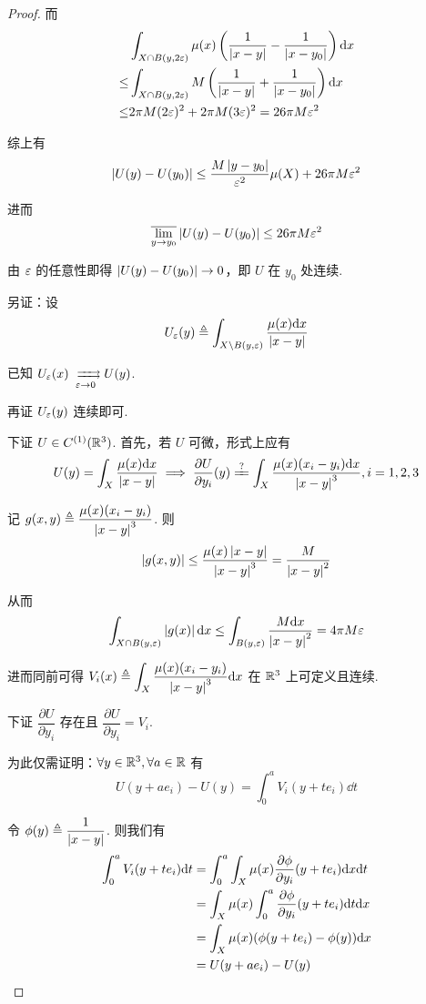 \begin{proof}
    而
$$
\begin{aligned}
    &\int_{X\cap B(y,2\varepsilon)}\mu(x)\left(\frac{1}{\left\lvert{x-y}\right\rvert}-\frac{1}{\left\lvert{x-y_0}\right\rvert}\right)\mathrm{d} x\\
    \le&\int_{X\cap B(y,2\varepsilon)}M\left(\frac{1}{\left\lvert{x-y}\right\rvert}+\frac{1}{\left\lvert{x-y_0}\right\rvert}\right)\mathrm{d} x\\
    \le&2\pi M(2\varepsilon)^2+2\pi M(3\varepsilon)^2=26\pi M\varepsilon^2
\end{aligned}
$$

    综上有
$$
\left\lvert{U(y)-U(y_0)}\right\rvert\le\frac{M\left\lvert{y-y_0}\right\rvert}{\varepsilon^2}\mu(X)+26\pi M\varepsilon^2
$$

    进而
$$
\overline{\lim_{y\to y_0}}\left\lvert{U(y)-U(y_0)}\right\rvert\le 26\pi M\varepsilon^2
$$

    由 $\varepsilon$ 的任意性即得 $\left\lvert{U(y)-U(y_0)}\right\rvert\to 0$，即 $U$ 在 $y_0$ 处连续.

    \begin{hint}
        另证：设
$$
U_\varepsilon(y)\triangleq\int_{X\setminus B(y,\varepsilon)}\frac{\mu(x)\mathrm{d} x}{\left\lvert{x-y}\right\rvert}
$$

        已知 $U_\eps(x)\xrightrightarrows[\eps\to 0]{}U(y)$.

        再证 $U_\varepsilon(y)$ 连续即可.
    \end{hint}

    下证 $U\in C^{(1)}(\mathbb{R}^3)$. 首先，若 $U$ 可微，形式上应有
$$
U(y)=\int_X\frac{\mu(x)\dd x}{\abs{x-y}}\implies\frac{\partial U}{\partial y_i}(y)\xlongequal{?}\int_X\frac{\mu(x)(x_i-y_i)\dd x}{\abs{x-y}^3},i=1,2,3
$$

    记 $g(x,y)\triangleq\dfrac{\mu(x)(x_i-y_i)}{\left\lvert{x-y}\right\rvert^3}$. 则
$$
\left\lvert{g(x,y)}\right\rvert\le\frac{\mu(x)\left\lvert{x-y}\right\rvert}{\left\lvert{x-y}\right\rvert^3}=\frac{M}{\left\lvert{x-y}\right\rvert^2}
$$

    从而
$$
\int_{X\cap B(y,\varepsilon)}\left\lvert{g(x)}\right\rvert\mathrm{d} x\le\int_{B(y,\varepsilon)}\frac{M\mathrm{d} x}{\left\lvert{x-y}\right\rvert^2}=4\pi M\varepsilon
$$

    进而同前可得 $V_i(x)\triangleq\displaystyle\int_X\frac{\mu(x)(x_i-y_i)}{\left\lvert{x-y}\right\rvert^3}\mathrm{d} x$ 在 $\mathbb{R}^3$ 上可定义且连续.

    下证 $\dfrac{\partial U}{\partial y_i}$ 存在且 $\dfrac{\partial U}{\partial y_i}=V_i$.

    为此仅需证明：$\forall y\in\mathbb{R}^3,\forall a\in\mathbb{R}$ 有
$$
U(y+a e_i)-U(y)=\int_0^aV_i(y+te_i)\dd t
$$

    令 $\phi(y)\triangleq\dfrac{1}{\left\lvert{x-y}\right\rvert}$. 则我们有
$$
\begin{aligned}
    \int_0^aV_i(y+te_i)\mathrm{d} t&=\int_0^a\int_X\mu(x)\frac{\partial{\phi}}{\partial{y_i}}(y+te_i)\mathrm{d} x\mathrm{d} t\\
    &=\int_X\mu(x)\int_0^a\frac{\partial{\phi}}{\partial{y_i}}(y+te_i)\mathrm{d} t\mathrm{d} x\\
    &=\int_X\mu(x)(\phi(y+te_i)-\phi(y))\mathrm{d} x\\
    &=U(y+ae_i)-U(y)
\end{aligned}
$$


\end{proof}
